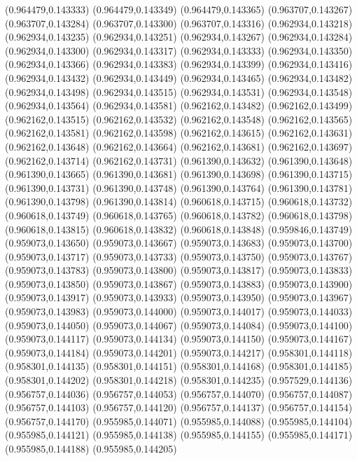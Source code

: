(0.964479,0.143333)
(0.964479,0.143349)
(0.964479,0.143365)
(0.963707,0.143267)
(0.963707,0.143284)
(0.963707,0.143300)
(0.963707,0.143316)
(0.962934,0.143218)
(0.962934,0.143235)
(0.962934,0.143251)
(0.962934,0.143267)
(0.962934,0.143284)
(0.962934,0.143300)
(0.962934,0.143317)
(0.962934,0.143333)
(0.962934,0.143350)
(0.962934,0.143366)
(0.962934,0.143383)
(0.962934,0.143399)
(0.962934,0.143416)
(0.962934,0.143432)
(0.962934,0.143449)
(0.962934,0.143465)
(0.962934,0.143482)
(0.962934,0.143498)
(0.962934,0.143515)
(0.962934,0.143531)
(0.962934,0.143548)
(0.962934,0.143564)
(0.962934,0.143581)
(0.962162,0.143482)
(0.962162,0.143499)
(0.962162,0.143515)
(0.962162,0.143532)
(0.962162,0.143548)
(0.962162,0.143565)
(0.962162,0.143581)
(0.962162,0.143598)
(0.962162,0.143615)
(0.962162,0.143631)
(0.962162,0.143648)
(0.962162,0.143664)
(0.962162,0.143681)
(0.962162,0.143697)
(0.962162,0.143714)
(0.962162,0.143731)
(0.961390,0.143632)
(0.961390,0.143648)
(0.961390,0.143665)
(0.961390,0.143681)
(0.961390,0.143698)
(0.961390,0.143715)
(0.961390,0.143731)
(0.961390,0.143748)
(0.961390,0.143764)
(0.961390,0.143781)
(0.961390,0.143798)
(0.961390,0.143814)
(0.960618,0.143715)
(0.960618,0.143732)
(0.960618,0.143749)
(0.960618,0.143765)
(0.960618,0.143782)
(0.960618,0.143798)
(0.960618,0.143815)
(0.960618,0.143832)
(0.960618,0.143848)
(0.959846,0.143749)
(0.959073,0.143650)
(0.959073,0.143667)
(0.959073,0.143683)
(0.959073,0.143700)
(0.959073,0.143717)
(0.959073,0.143733)
(0.959073,0.143750)
(0.959073,0.143767)
(0.959073,0.143783)
(0.959073,0.143800)
(0.959073,0.143817)
(0.959073,0.143833)
(0.959073,0.143850)
(0.959073,0.143867)
(0.959073,0.143883)
(0.959073,0.143900)
(0.959073,0.143917)
(0.959073,0.143933)
(0.959073,0.143950)
(0.959073,0.143967)
(0.959073,0.143983)
(0.959073,0.144000)
(0.959073,0.144017)
(0.959073,0.144033)
(0.959073,0.144050)
(0.959073,0.144067)
(0.959073,0.144084)
(0.959073,0.144100)
(0.959073,0.144117)
(0.959073,0.144134)
(0.959073,0.144150)
(0.959073,0.144167)
(0.959073,0.144184)
(0.959073,0.144201)
(0.959073,0.144217)
(0.958301,0.144118)
(0.958301,0.144135)
(0.958301,0.144151)
(0.958301,0.144168)
(0.958301,0.144185)
(0.958301,0.144202)
(0.958301,0.144218)
(0.958301,0.144235)
(0.957529,0.144136)
(0.956757,0.144036)
(0.956757,0.144053)
(0.956757,0.144070)
(0.956757,0.144087)
(0.956757,0.144103)
(0.956757,0.144120)
(0.956757,0.144137)
(0.956757,0.144154)
(0.956757,0.144170)
(0.955985,0.144071)
(0.955985,0.144088)
(0.955985,0.144104)
(0.955985,0.144121)
(0.955985,0.144138)
(0.955985,0.144155)
(0.955985,0.144171)
(0.955985,0.144188)
(0.955985,0.144205)
